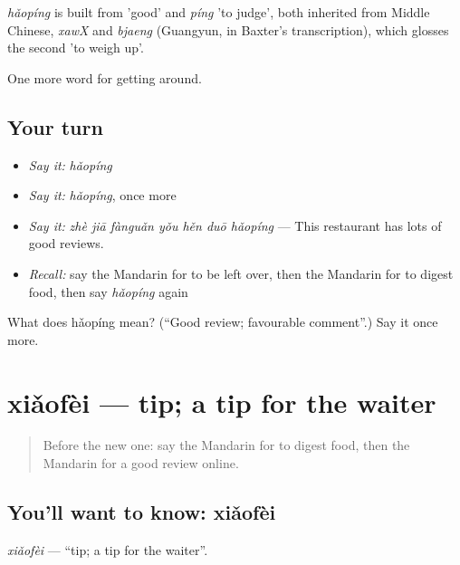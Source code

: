 \begin{cousinweb}
\emph{hǎopíng} is built from  'good' and \emph{píng} 'to judge', both inherited from Middle Chinese, \emph{xawX} and \emph{bjaeng} (Guangyun, in Baxter's transcription), which glosses the second 'to weigh up'.
\end{cousinweb}

\begin{grammarlens}[title={What you've built}]
One more word for getting around.
\end{grammarlens}

\subsection*{Your turn}
\begin{itemize}
\raggedright
  \item \emph{Say it:} \emph{hǎopíng}
  \item \emph{Say it:} \emph{hǎopíng}, once more
  \item \emph{Say it:} \emph{zhè jiā fànguǎn yǒu hěn duō hǎopíng} — This restaurant has lots of good reviews.
  \item \emph{Recall:} say the Mandarin for to be left over, then the Mandarin for to digest food, then say \emph{hǎopíng} again
\end{itemize}

\begin{tcolorbox}[breakable,colback=teal!4,colframe=teal!35!black,title={Before you move on}]
What does hǎopíng mean? (\textquotedblleft{}Good review; favourable comment\textquotedblright{}.) Say it once more.
\end{tcolorbox}
\section[xiǎofèi]{xiǎofèi — tip; a tip for the waiter}

\label{lesson:ZH-C452-xiaofei}



\begin{quote}
Before the new one: say the Mandarin for to digest food, then the Mandarin for a good review online.
\end{quote}

\subsection*{You'll want to know: xiǎofèi}
\emph{xiǎofèi} — \textquotedblleft{}tip; a tip for the waiter\textquotedblright{}.

